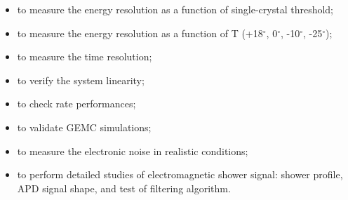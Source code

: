 \begin{itemize}
\item to measure the energy resolution as a function of single-crystal threshold;
\item to measure the energy resolution as a function of T (+18$^\circ$, 0$^\circ$, -10$^\circ$, -25$^\circ$);
\item to measure the time resolution;
\item to verify the system linearity;
\item to check rate performances;
\item to validate GEMC simulations;
\item to measure the electronic noise in realistic conditions;
\item to perform detailed studies of electromagnetic shower signal: shower profile, APD signal shape, and test of filtering algorithm.
\end{itemize}

